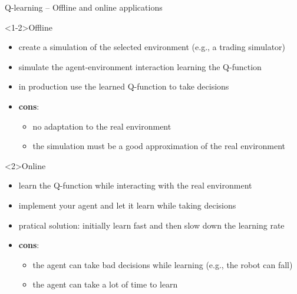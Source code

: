 \documentclass[presentation, 9pt]{beamer}\mode<presentation>{\usetheme{AMSBolognaFC}}
\begin{document}
\begin{frame}{Q-learning -- Offline and online applications}
\begin{exampleblock}<1-2>{Offline}
	\begin{itemize}
		\item create a simulation of the selected environment (e.g., a trading simulator)
		\item simulate the agent-environment interaction learning the Q-function
		\item in production use the learned Q-function to take decisions
		\item \textbf{cons}: 
		\begin{itemize}
			\item no adaptation to the real environment
			\item the simulation must be a good approximation of the real environment
		\end{itemize}
	\end{itemize}
\end{exampleblock}
\begin{alertblock}<2>{Online}
	\begin{itemize}
		\item learn the Q-function while interacting with the real environment
		\item implement your agent and let it learn while taking decisions
		\item pratical solution: initially learn fast and then slow down the learning rate
		\item \textbf{cons}:
		\begin{itemize}
			\item the agent can take bad decisions while learning (e.g., the robot can fall)
			\item the agent can take a lot of time to learn
		\end{itemize}
	\end{itemize}
\end{alertblock}
\end{frame}
\end{document}
